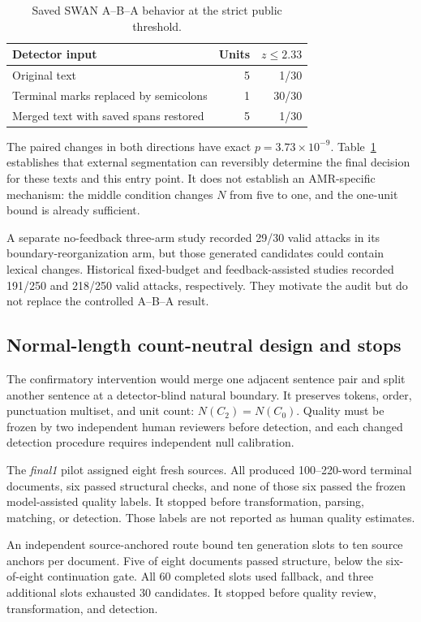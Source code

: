 \documentclass[10pt]{article}
\begin{document}
\begin{table}[t]
\caption{Saved SWAN A--B--A behavior at the strict public threshold.}
\label{tab:swan-aba}
\centering
\begin{tabular}{lrr}
\toprule
Detector input & Units & $z\leq2.33$ \\
\midrule
Original text & 5 & 1/30 \\
Terminal marks replaced by semicolons & 1 & 30/30 \\
Merged text with saved spans restored & 5 & 1/30 \\
\bottomrule
\end{tabular}
\end{table}

The paired changes in both directions have exact $p=3.73\times10^{-9}$.
Table~\ref{tab:swan-aba} establishes that external segmentation can
reversibly determine the final decision for these texts and this entry point.
It does not establish an AMR-specific mechanism: the middle condition changes
$N$ from five to one, and the one-unit bound is already sufficient.

A separate no-feedback three-arm study recorded 29/30 valid attacks in its
boundary-reorganization arm, but those generated candidates could contain
lexical changes. Historical fixed-budget and feedback-assisted studies
recorded 191/250 and 218/250 valid attacks, respectively. They motivate the
audit but do not replace the controlled A--B--A result.

\subsection{Normal-length count-neutral design and stops}

The confirmatory intervention would merge one adjacent sentence pair and
split another sentence at a detector-blind natural boundary. It preserves
tokens, order, punctuation multiset, and unit count:
$N(C_2)=N(C_0)$. Quality must be frozen by two independent human reviewers
before detection, and each changed detection procedure requires independent
null calibration.

The \emph{final1} pilot assigned eight fresh sources. All produced
100--220-word terminal documents, six passed structural checks, and none of
those six passed the frozen model-assisted quality labels. It stopped before
transformation, parsing, matching, or detection. Those labels are not
reported as human quality estimates.

An independent source-anchored route bound ten generation slots to ten source
anchors per document. Five of eight documents passed structure, below the
six-of-eight continuation gate. All 60 completed slots used fallback, and
three additional slots exhausted 30 candidates. It stopped before quality
review, transformation, and detection.
\end{document}
